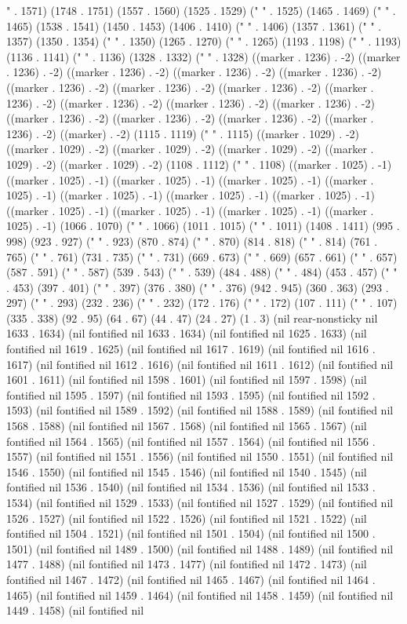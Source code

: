 " . 1571) (1748 . 1751) (1557 . 1560) (1525 . 1529) (" " . 1525) (1465 . 1469) (" " . 1465) (1538 . 1541) (1450 . 1453) (1406 . 1410) (" " . 1406) (1357 . 1361) (" " . 1357) (1350 . 1354) (" " . 1350) (1265 . 1270) ("   " . 1265) (1193 . 1198) ("   " . 1193) (1136 . 1141) ("   " . 1136) (1328 . 1332) ("  " . 1328) ((marker . 1236) . -2) ((marker . 1236) . -2) ((marker . 1236) . -2) ((marker . 1236) . -2) ((marker . 1236) . -2) ((marker . 1236) . -2) ((marker . 1236) . -2) ((marker . 1236) . -2) ((marker . 1236) . -2) ((marker . 1236) . -2) ((marker . 1236) . -2) ((marker . 1236) . -2) ((marker . 1236) . -2) ((marker . 1236) . -2) ((marker . 1236) . -2) ((marker . 1236) . -2) ((marker) . -2) (1115 . 1119) ("  " . 1115) ((marker . 1029) . -2) ((marker . 1029) . -2) ((marker . 1029) . -2) ((marker . 1029) . -2) ((marker . 1029) . -2) ((marker . 1029) . -2) (1108 . 1112) (" " . 1108) ((marker . 1025) . -1) ((marker . 1025) . -1) ((marker . 1025) . -1) ((marker . 1025) . -1) ((marker . 1025) . -1) ((marker . 1025) . -1) ((marker . 1025) . -1) ((marker . 1025) . -1) ((marker . 1025) . -1) ((marker . 1025) . -1) ((marker . 1025) . -1) ((marker . 1025) . -1) (1066 . 1070) (" " . 1066) (1011 . 1015) (" " . 1011) (1408 . 1411) (995 . 998) (923 . 927) (" " . 923) (870 . 874) (" " . 870) (814 . 818) (" " . 814) (761 . 765) (" " . 761) (731 . 735) (" " . 731) (669 . 673) (" " . 669) (657 . 661) (" " . 657) (587 . 591) (" " . 587) (539 . 543) (" " . 539) (484 . 488) (" " . 484) (453 . 457) (" " . 453) (397 . 401) (" " . 397) (376 . 380) (" " . 376) (942 . 945) (360 . 363) (293 . 297) (" " . 293) (232 . 236) (" " . 232) (172 . 176) (" " . 172) (107 . 111) (" " . 107) (335 . 338) (92 . 95) (64 . 67) (44 . 47) (24 . 27) (1 . 3) (nil rear-nonsticky nil 1633 . 1634) (nil fontified nil 1633 . 1634) (nil fontified nil 1625 . 1633) (nil fontified nil 1619 . 1625) (nil fontified nil 1617 . 1619) (nil fontified nil 1616 . 1617) (nil fontified nil 1612 . 1616) (nil fontified nil 1611 . 1612) (nil fontified nil 1601 . 1611) (nil fontified nil 1598 . 1601) (nil fontified nil 1597 . 1598) (nil fontified nil 1595 . 1597) (nil fontified nil 1593 . 1595) (nil fontified nil 1592 . 1593) (nil fontified nil 1589 . 1592) (nil fontified nil 1588 . 1589) (nil fontified nil 1568 . 1588) (nil fontified nil 1567 . 1568) (nil fontified nil 1565 . 1567) (nil fontified nil 1564 . 1565) (nil fontified nil 1557 . 1564) (nil fontified nil 1556 . 1557) (nil fontified nil 1551 . 1556) (nil fontified nil 1550 . 1551) (nil fontified nil 1546 . 1550) (nil fontified nil 1545 . 1546) (nil fontified nil 1540 . 1545) (nil fontified nil 1536 . 1540) (nil fontified nil 1534 . 1536) (nil fontified nil 1533 . 1534) (nil fontified nil 1529 . 1533) (nil fontified nil 1527 . 1529) (nil fontified nil 1526 . 1527) (nil fontified nil 1522 . 1526) (nil fontified nil 1521 . 1522) (nil fontified nil 1504 . 1521) (nil fontified nil 1501 . 1504) (nil fontified nil 1500 . 1501) (nil fontified nil 1489 . 1500) (nil fontified nil 1488 . 1489) (nil fontified nil 1477 . 1488) (nil fontified nil 1473 . 1477) (nil fontified nil 1472 . 1473) (nil fontified nil 1467 . 1472) (nil fontified nil 1465 . 1467) (nil fontified nil 1464 . 1465) (nil fontified nil 1459 . 1464) (nil fontified nil 1458 . 1459) (nil fontified nil 1449 . 1458) (nil fontified nil 